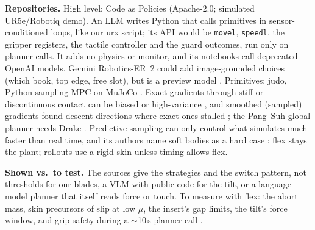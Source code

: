 \documentclass[10pt,twocolumn]{article}
\newcommand{\code}[1]{\texttt{\small #1}}
\begin{document}
\textbf{Repositories.} High level: Code as Policies \cite{liang2023cap} (Apache-2.0; simulated UR5e/Robotiq
demo). An LLM writes Python that calls primitives in sensor-conditioned loops, like our urx script; its API would
be \code{movel}, \code{speedl}, the gripper registers, the tactile controller and the guard outcomes, run only on
planner calls. It adds no physics or monitor, and its notebooks call deprecated OpenAI models. Gemini
Robotics-ER~2 could add image-grounded choices (which book, top edge, free slot), but is a preview model
\cite{geminiapi2026er}. Primitives: judo, Python sampling MPC on MuJoCo \cite{li2025judo}. Exact gradients through
stiff or discontinuous contact can be biased or high-variance \cite{suh2022icml}, and smoothed (sampled) gradients
found descent directions where exact ones stalled \cite{suh2022bundled}; the Pang--Suh global planner needs Drake
\cite{pang2023tro}. Predictive sampling can only control what simulates much faster than real time, and its
authors name soft bodies as a hard case \cite{howell2022mjpc}: flex stays the plant; rollouts use a rigid skin
unless timing allows flex.

\textbf{Shown vs.\ to test.} The sources give the strategies and the switch pattern, not thresholds for our blades,
a VLM with public code for the tilt, or a language-model planner that itself reads force or touch. To measure with
flex: the abort mass, skin precursors of slip at low $\mu$, the insert's gap limits, the tilt's force window, and
grip safety during a $\sim$10\,s planner call \cite{xie2024deligrasp}.
\end{document}
